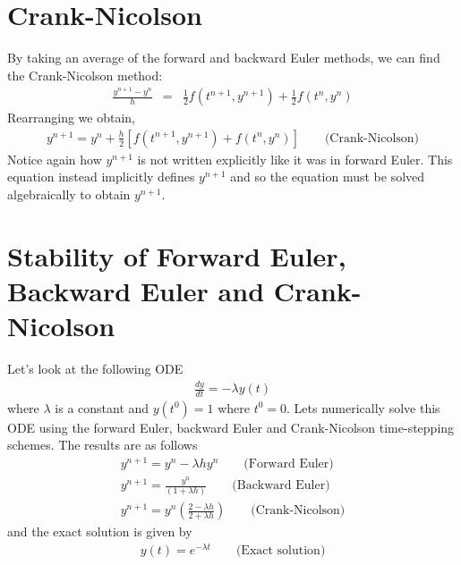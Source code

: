 \section{Crank-Nicolson}
By taking an average of the forward and backward Euler methods, we can find the Crank-Nicolson method:
\begin{eqnarray}
\frac{y^{n+1}-y^{n}}{h}&=&\frac{1}{2}f(t^{n+1},y^{n+1})+\frac{1}{2}f(t^n,y^n)
\end{eqnarray}
Rearranging we obtain,
\begin{eqnarray}
y^{n+1}=y^n+\frac{h}{2}\left[ f(t^{n+1},y^{n+1})+f(t^n,y^n) \right] \qquad \text{(Crank-Nicolson)}
\end{eqnarray}
Notice again how $y^{n+1}$ is not written explicitly like it was in forward Euler. This equation instead implicitly defines $y^{n+1}$ and so the equation must be solved algebraically to obtain $y^{n+1}$. 
\section{Stability of Forward Euler, Backward Euler and Crank-Nicolson}
Let's look at the following ODE
\begin{eqnarray}
\frac{dy}{dt}= -\lambda y(t) \label{eq:ODEstability}
\end{eqnarray}
where $\lambda$ is a constant and $y(t^0)=1$ where $t^0=0$. Lets numerically solve this ODE using the forward Euler, backward Euler and Crank-Nicolson time-stepping schemes. The results are as follows
\begin{eqnarray}
y^{n+1}=y^n-\lambda h y^n \qquad \text{(Forward Euler)}\\
y^{n+1} = \frac{y^n}{(1+\lambda h)} \qquad \text{(Backward Euler)} \\
y^{n+1} = y^n\left(\frac{2-\lambda h}{2+\lambda h}\right) \qquad \text{(Crank-Nicolson)} 
\end{eqnarray}
and the exact solution is given by
\begin{eqnarray}
y(t)= e^{-\lambda t} \qquad \text{(Exact solution)}
\end{eqnarray}

